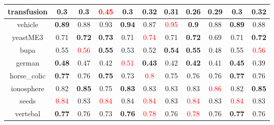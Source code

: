 \documentclass{article}%
\begin{document}
\begin{tabular}{c|cccccccccc}
\hline%
transfusion&0.3&0.3&\textcolor{red}{ 
0.45
}&0.3&\textbf{0.32}&0.31&0.26&\textbf{0.29}&0.3&\textbf{0.32}\\%
\hline%
vehicle&\textbf{0.89}&0.88&0.93&\textbf{0.94}&0.87&\textcolor{red}{ 
0.95
}&\textbf{0.9}&0.88&\textbf{0.89}&0.88\\%
\hline%
yeastME3&0.71&\textbf{0.72}&\textbf{0.73}&0.71&\textcolor{red}{ 
0.74
}&0.71&\textbf{0.72}&0.69&0.71&\textbf{0.72}\\%
\hline%
bupa&0.55&\textcolor{red}{ 
0.56
}&\textbf{0.55}&0.53&0.52&\textbf{0.54}&\textbf{0.55}&0.48&0.55&\textcolor{red}{ 
0.56
}\\%
\hline%
german&\textbf{0.48}&0.47&0.42&\textcolor{red}{ 
0.51
}&\textbf{0.43}&0.42&\textbf{0.42}&0.41&\textbf{0.45}&0.39\\%
\hline%
horse\_colic&\textbf{0.77}&0.76&\textbf{0.75}&0.73&\textcolor{red}{ 
0.8
}&0.75&0.76&0.76&\textbf{0.77}&0.76\\%
\hline%
ionosphere&0.82&\textbf{0.85}&0.75&\textbf{0.83}&0.83&0.83&0.83&\textcolor{red}{ 
0.86
}&0.82&\textbf{0.85}\\%
\hline%
seeds&\textcolor{red}{ 
0.84
}&0.83&\textcolor{red}{ 
0.84
}&0.84&\textcolor{red}{ 
0.84
}&0.83&\textcolor{red}{ 
0.84
}&0.83&\textcolor{red}{ 
0.84
}&0.83\\%
\hline%
vertebal&\textbf{0.77}&0.76&0.73&\textbf{0.76}&\textcolor{red}{ 
0.78
}&0.76&\textcolor{red}{ 
0.78
}&0.76&\textbf{0.77}&0.76\\%
\hline%
\end{tabular}

%
\end{document}
